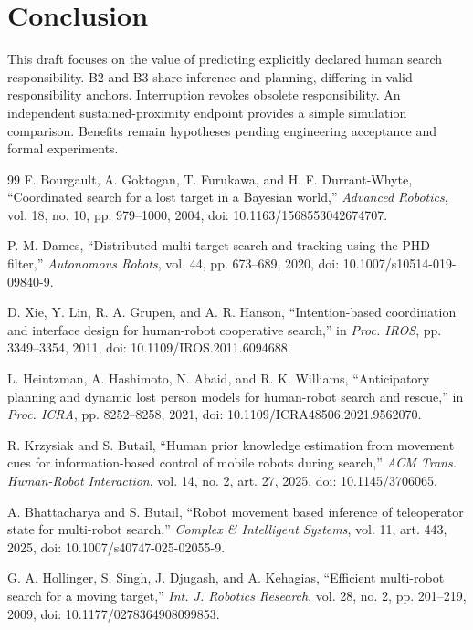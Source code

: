\documentclass[conference]{IEEEtran}
\begin{document}
\section{Conclusion}
This draft focuses on the value of predicting explicitly declared human search responsibility. B2 and B3 share inference and planning, differing in valid responsibility anchors. Interruption revokes obsolete responsibility. An independent sustained-proximity endpoint provides a simple simulation comparison. Benefits remain hypotheses pending engineering acceptance and formal experiments.
\begin{thebibliography}{99}
F. Bourgault, A. Goktogan, T. Furukawa, and H. F. Durrant-Whyte, ``Coordinated search for a lost target in a Bayesian world,'' \emph{Advanced Robotics}, vol. 18, no. 10, pp. 979--1000, 2004, doi: 10.1163/1568553042674707.

P. M. Dames, ``Distributed multi-target search and tracking using the PHD filter,'' \emph{Autonomous Robots}, vol. 44, pp. 673--689, 2020, doi: 10.1007/s10514-019-09840-9.

D. Xie, Y. Lin, R. A. Grupen, and A. R. Hanson, ``Intention-based coordination and interface design for human-robot cooperative search,'' in \emph{Proc. IROS}, pp. 3349--3354, 2011, doi: 10.1109/IROS.2011.6094688.

L. Heintzman, A. Hashimoto, N. Abaid, and R. K. Williams, ``Anticipatory planning and dynamic lost person models for human-robot search and rescue,'' in \emph{Proc. ICRA}, pp. 8252--8258, 2021, doi: 10.1109/ICRA48506.2021.9562070.

R. Krzysiak and S. Butail, ``Human prior knowledge estimation from movement cues for information-based control of mobile robots during search,'' \emph{ACM Trans. Human-Robot Interaction}, vol. 14, no. 2, art. 27, 2025, doi: 10.1145/3706065.

A. Bhattacharya and S. Butail, ``Robot movement based inference of teleoperator state for multi-robot search,'' \emph{Complex \& Intelligent Systems}, vol. 11, art. 443, 2025, doi: 10.1007/s40747-025-02055-9.

G. A. Hollinger, S. Singh, J. Djugash, and A. Kehagias, ``Efficient multi-robot search for a moving target,'' \emph{Int. J. Robotics Research}, vol. 28, no. 2, pp. 201--219, 2009, doi: 10.1177/0278364908099853.


\end{thebibliography}
\end{document}
